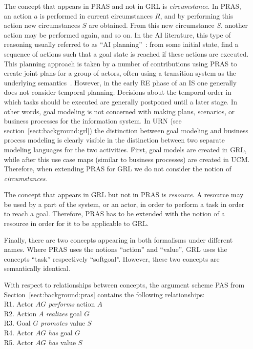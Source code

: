\documentclass[11.5pt,two column]{llncs}
\begin{document}
The concept that appears in PRAS and not in GRL is \emph{circumstance}. In PRAS, an action $a$ is performed in current circumstances $R$, and by performing this action new circumstances $S$ are obtained. From this new circumstance $S$, another action may be performed again, and so on. In the AI literature, this type of reasoning usually referred to as ``AI planning''~\cite{weld1999recent}: from some initial state, find a sequence of actions such that a goal state is reached if these actions are executed. This planning approach is taken by a number of contributions using PRAS to create joint plans for a group of actors, often using a transition system as the underlying semantics~\cite{medellin2014}. However, in the early RE phase of an IS one generally does not consider temporal planning. Decisions about the temporal order in which tasks should be executed are generally postponed until a later stage. In other words, goal modeling is not concerned with making plans, scenarios, or business processes for the information system. In URN (see section~\ref{sect:background:grl}) the distinction between goal modeling and business process modeling is clearly visible in the distinction between two separate modeling languages for the two activities. First, goal models are created in GRL, while after this use case maps (similar to business processes) are created in UCM. Therefore, when extending PRAS for GRL we do not consider the notion of \emph{circumstances}.

The concept that appears in GRL but not in PRAS is \emph{resource}. A resource may be used by a part of the system, or an actor, in order to perform a task in order to reach a goal. Therefore, PRAS has to be extended with the notion of a resource in order for it to be applicable to GRL.

Finally, there are two concepts appearing in both formalisms under different names. Where PRAS uses the notions ``action'' and ``value'', GRL uses the concepts ``task'' respectively ``softgoal''. However, these two concepts are semantically identical.

With respect to relationships between concepts, the argument scheme PAS from Section~\ref{sect:background:pras} contains the following relationships:\\

\noindent
R1. Actor $AG$ \emph{performs} action $A$\\
R2. Action $A$ \emph{realizes} goal $G$\\
R3. Goal $G$ \emph{promotes} value $S$\\
R4. Actor $AG$ \emph{has} goal $G$\\
R5. Actor $AG$ \emph{has} value $S$\\
\end{document}
